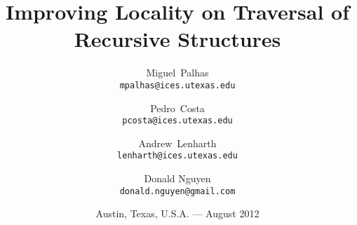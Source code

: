 

\titlehead{University of Texas%
\\%
\hfill Institute for Computational Engineering and Sciences%
\hfill Center for Distributed and Grid Computing}

\title{Improving Locality on Traversal of Recursive Structures}


\author{Miguel~Palhas\\\texttt{\smaller mpalhas@ices.utexas.edu}%
\and Pedro~Costa\\\texttt{\smaller pcosta@ices.utexas.edu}%
\and Andrew~Lenharth\\\texttt{\smaller lenharth@ices.utexas.edu}%
\and Donald Nguyen\\\texttt{\smaller donald.nguyen@gmail.com}%
}

\date{Austin, Texas, U.S.A. --- August 2012}

\subject{Summer Internship}